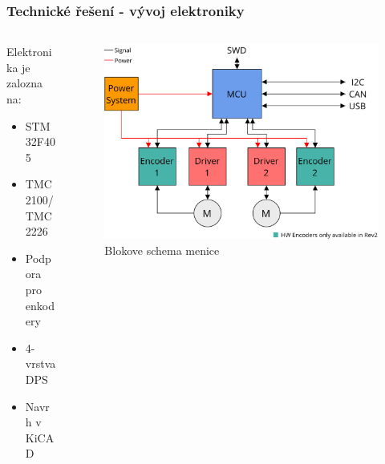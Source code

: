 \documentclass[%
  12pt,       				%
	t,                  %
	aspectratio=1610,   %
	unicode,						%
]{beamer}				    	%
\begin{document}
\begin{frame}
	\frametitle{Technické řešení - vývoj elektroniky}
	\begin{columns}[T] 								%
		\begin{column}{0.4\textwidth}		%
			Elektronika je zalozna na:\\[2ex]
			\begin{itemize}
				\item STM32F405
				\item TMC2100/TMC2226
				\item Podpora pro enkodery
				\item 4-vrstva DPS
				\item Navrh v KiCAD
			\end{itemize}
		\end{column}
		\begin{column}{0.6\textwidth}		%
			\begin{figure}%
				\centering              %
				\includegraphics[width=0.8\columnwidth]{../Thesis/obrazky/sm4_block_diagram}
				\caption{Blokove schema menice}%
				\label{fig:sm4_block}
			\end{figure}
		\end{column}
	\end{columns}
\end{frame}
\end{document}
